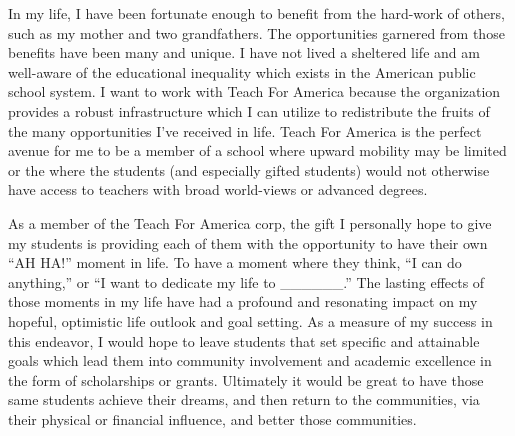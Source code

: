 \documentclass[11pt]{article}
\begin{document}
In my life, I have been fortunate enough to benefit from the hard-work
of others, such as my mother and two grandfathers. The opportunities
garnered from those benefits have been many and unique. I have not
lived a sheltered life and am well-aware of the educational inequality
which exists in the American public school system. I want to work with
Teach For America because the organization provides a robust
infrastructure which I can utilize to redistribute the fruits of the
many opportunities I've received in life. Teach For America is the
perfect avenue for me to be a member of a school where upward mobility
may be limited or the where the students (and especially gifted
students) would not otherwise have access to teachers with broad
world-views or advanced degrees.

As a member of the Teach For America corp, the gift I personally hope
to give my students is providing each of them with the opportunity to
have their own ``AH HA!''  moment in life. To have a moment where they
think, ``I can do anything,'' or ``I want to dedicate my life to
\_\_\_\_\_\_.'' The lasting effects of those moments in my life have
had a profound and resonating impact on my hopeful, optimistic life
outlook and goal setting. As a measure of my success in this endeavor,
I would hope to leave students that set specific and attainable goals
which lead them into community involvement and academic excellence in
the form of scholarships or grants. Ultimately it would be great to
have those same students achieve their dreams, and then return to the
communities, via their physical or financial influence, and better
those communities.
\end{document}
